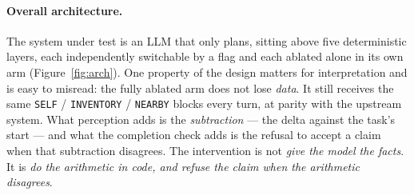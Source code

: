 \documentclass[11pt]{article}
\newcommand{\runin}[1]{\paragraph{#1}}
\begin{document}
\runin{Overall architecture.}
The system under test is an LLM that only plans, sitting above five
deterministic layers, each independently switchable by a flag and each
ablated alone in its own arm (Figure~\ref{fig:arch}). One property of
the design matters for interpretation and is easy to misread: the fully
ablated arm does not lose \emph{data}. It still receives the same
\texttt{SELF} / \texttt{INVENTORY} / \texttt{NEARBY} blocks every turn,
at parity with the upstream system. What perception adds is the
\emph{subtraction} --- the delta against the task's start --- and what
the completion check adds is the refusal to accept a claim when that
subtraction disagrees. The intervention is not \emph{give the model the
facts}. It is \emph{do the arithmetic in code, and refuse the claim when
the arithmetic disagrees}.
\end{document}

